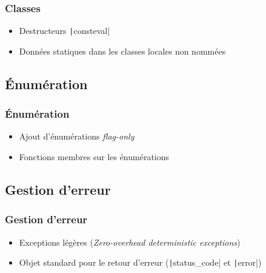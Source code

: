 \documentclass[C++.tex]{subfiles}
\begin{document}
\begin{frame}[fragile]
	\frametitle{Classes}
	\begin{itemize}
		\item Destructeurs \texttt|consteval|
		\item Données statiques dans les classes locales non nommées
	\end{itemize}

\end{frame}

\subsection*{Énumération}
\begin{frame}[fragile]
	\frametitle{Énumération}
	\begin{itemize}
		\item Ajout d'énumérations \og{}\textit{flag-only}\fg{}
		\item Fonctions membres sur les énumérations
	\end{itemize}

\end{frame}

\subsection*{Gestion d'erreur}
\begin{frame}[fragile]
	\frametitle{Gestion d'erreur}
	\begin{itemize}
		\item Exceptions légères (\textit{Zero-overhead deterministic exceptions})
		\item Objet standard pour le retour d'erreur (\texttt|status_code| et \texttt|error|)
	\end{itemize}

\end{frame}
\end{document}
